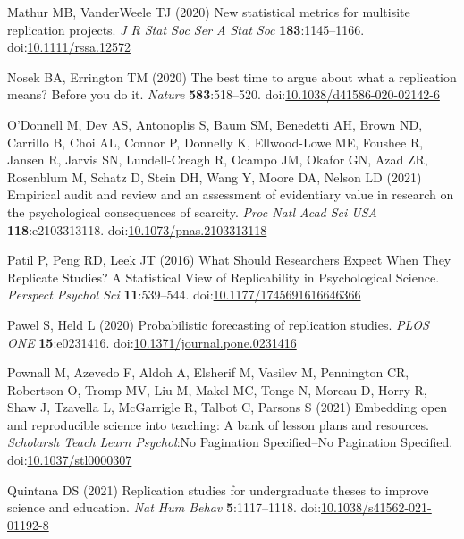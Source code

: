 \documentclass[
  english,
  a4paper,
]{article}
\newlength{\cslhangindent}
\newlength{\cslentryspacingunit} %
\newenvironment{CSLReferences}[2] %
 {%
  \setlength{\parindent}{0pt}
  \ifodd #1
  \let\oldpar\par
  \def\par{\hangindent=\cslhangindent\oldpar}
  \fi
  \setlength{\parskip}{#2\cslentryspacingunit}
 }%
 {}
\begin{document}
\begin{CSLReferences}{1}{0}
\leavevmode{}%
Mathur MB, VanderWeele TJ (2020) New statistical metrics for multisite replication projects. \emph{J R Stat Soc Ser A Stat Soc} \textbf{183}:1145--1166. doi:\href{https://doi.org/10.1111/rssa.12572}{10.1111/rssa.12572}

\leavevmode{}%
Nosek BA, Errington TM (2020) The best time to argue about what a replication means? {Before} you do it. \emph{Nature} \textbf{583}:518--520. doi:\href{https://doi.org/10.1038/d41586-020-02142-6}{10.1038/d41586-020-02142-6}

\leavevmode{}%
O'Donnell M, Dev AS, Antonoplis S, Baum SM, Benedetti AH, Brown ND, Carrillo B, Choi AL, Connor P, Donnelly K, Ellwood-Lowe ME, Foushee R, Jansen R, Jarvis SN, Lundell-Creagh R, Ocampo JM, Okafor GN, Azad ZR, Rosenblum M, Schatz D, Stein DH, Wang Y, Moore DA, Nelson LD (2021) Empirical audit and review and an assessment of evidentiary value in research on the psychological consequences of scarcity. \emph{Proc Natl Acad Sci USA} \textbf{118}:e2103313118. doi:\href{https://doi.org/10.1073/pnas.2103313118}{10.1073/pnas.2103313118}

\leavevmode{}%
Patil P, Peng RD, Leek JT (2016) What {Should Researchers Expect When They Replicate Studies}? {A Statistical View} of {Replicability} in {Psychological Science}. \emph{Perspect Psychol Sci} \textbf{11}:539--544. doi:\href{https://doi.org/10.1177/1745691616646366}{10.1177/1745691616646366}

\leavevmode{}%
Pawel S, Held L (2020) Probabilistic forecasting of replication studies. \emph{PLOS ONE} \textbf{15}:e0231416. doi:\href{https://doi.org/10.1371/journal.pone.0231416}{10.1371/journal.pone.0231416}

\leavevmode{}%
Pownall M, Azevedo F, Aldoh A, Elsherif M, Vasilev M, Pennington CR, Robertson O, Tromp MV, Liu M, Makel MC, Tonge N, Moreau D, Horry R, Shaw J, Tzavella L, McGarrigle R, Talbot C, Parsons S (2021) Embedding open and reproducible science into teaching: {A} bank of lesson plans and resources. \emph{Scholarsh Teach Learn Psychol}:No Pagination Specified--No Pagination Specified. doi:\href{https://doi.org/10.1037/stl0000307}{10.1037/stl0000307}

\leavevmode{}%
Quintana DS (2021) Replication studies for undergraduate theses to improve science and education. \emph{Nat Hum Behav} \textbf{5}:1117--1118. doi:\href{https://doi.org/10.1038/s41562-021-01192-8}{10.1038/s41562-021-01192-8}


\end{CSLReferences}
\end{document}
